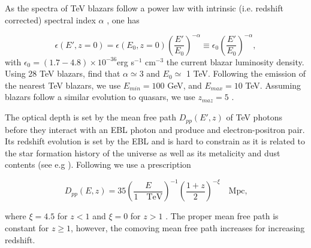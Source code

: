 \documentclass[twocolumns]{emulateapj}
\begin{document}
As the spectra of TeV blazars follow a power law with intrinsic (i.e. redshift corrected) spectral index $\alpha$ , one has

\begin{equation}
  \label{eq:blaz_lum}
  \epsilon(E',z=0)=\epsilon(E_0,z=0)\left(\frac{E'}{E_0}\right)^{-\alpha}\equiv \epsilon_0\left(\frac{E'}{E_0}\right)^{-\alpha},
\end{equation}
with $\epsilon_0=(1.7-4.8)\times 10^{-36}$erg s$^{-1}$ cm$^{-3}$ the current blazar luminosity density. Using 28 TeV blazars, \citet{2012ApJ...752...23C} find that $\alpha\simeq 3$ and $E_0\simeq $ 1 TeV. Following the emission of the nearest TeV blazars, we use $E_{min}=100$ GeV,  and $E_{max}=10$ TeV. Assuming blazars follow a similar evolution to quasars, we use $z_{maz}=5$  \citep{2007ApJ...654..731H}.

The optical depth is set by the mean free path  $D_{pp}(E',z)$ of  TeV photons before they interact with an EBL photon and produce and electron-positron pair. Its redshift evolution is set by the EBL and is hard to constrain as it is related to the star formation history of the universe as well as its metalicity and dust contents (see e.g \citet{2008A&A...487..837F,2006ApJ...648..774S}).  Following \citet{2012ApJ...752...23C} we use  a prescription 

  \begin{equation}
    \label{eq:mean_free_path}
  D_{pp}(E,z)=35\left(\frac{E}{1 \quad\textrm{TeV}}\right)^{-1} \left(\frac{1+z}{2}\right)^{-\xi} \quad \textrm{Mpc,}   
  \end{equation}

where $\xi=4.5$ for $z<1$ and $\xi=0$ for $z>1$ \citep{2004A&A...413..807K,2009PhRvD..80l3012N}. The proper mean free path is constant for $z\geq 1$, however, the comoving mean free path increases for increasing redshift.
\end{document}
